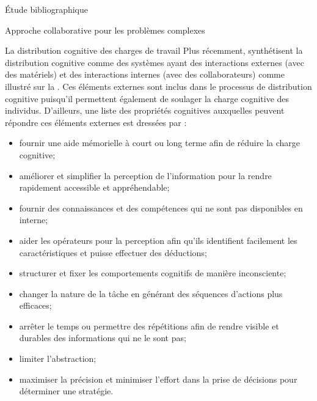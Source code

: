 \documentclass[myfrancais,ngerman,english,french]{mythesis}
\begin{document}
\begin{mychapter}{Étude bibliographique}
\begin{mysection}{Approche collaborative pour les problèmes complexes}
\begin{mysubsection}{La distribution cognitive des charges de travail}
				Plus récemment,  synthétisent la distribution cognitive comme des systèmes ayant des interactions externes (avec des matériels)  et des interactions internes (avec des collaborateurs) comme illustré sur la .
				Ces éléments externes sont inclus dans le processus de distribution cognitive puisqu'il permettent également de soulager la charge cognitive des individus.
				D'ailleurs, une liste des propriétés cognitives auxquelles peuvent répondre ces éléments externes est dressées par  :
				\begin{itemize}
					\item fournir une aide mémorielle à court ou long terme afin de réduire la charge cognitive;
					\item améliorer et simplifier la perception de l'information pour la rendre rapidement accessible et appréhendable;
					\item fournir des connaissances et des compétences qui ne sont pas disponibles en interne;
					\item aider les opérateurs pour la perception afin qu'ils identifient facilement les caractéristiques et puisse effectuer des déductions;
					\item structurer et fixer les comportements cognitifs de manière inconsciente;
					\item changer la nature de la tâche en générant des séquences d'actions plus efficaces;
					\item arrêter le temps ou permettre des répétitions afin de rendre visible et durables des informations qui ne le sont pas;
					\item limiter l'abstraction;
					\item maximiser la précision et minimiser l'effort dans la prise de décisions pour déterminer une stratégie.
				\end{itemize}


\end{mysubsection}
\end{mysection}
\end{mychapter}
\end{document}
